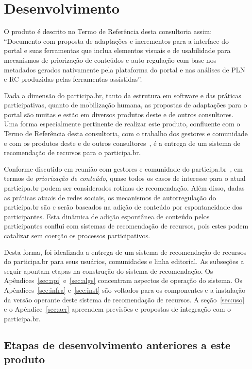 \documentclass[12pt]{article}
\begin{document}
\section{Desenvolvimento}\label{sec:dev}
O produto é descrito no Termo de Referência desta consultoria assim: ``Documento com proposta de adaptações e incrementos para a interface do portal e suas ferramentas que inclua elementos visuais e de usabilidade para mecanismos de priorização de conteúdos e auto-regulação com base nos metadados gerados nativamente pela plataforma do portal e nas análises de PLN e RC produzidas pelas ferramentas assistidas''.

Dada a dimensão do participa.br, tanto da estrutura em software e das práticas participativas, quanto de mobilização humana, as propostas de adaptações para o portal são muitas e estão em diversos produtos deste e de outros consultores. Uma forma especialmente pertinente de realizar este produto, confluente com o Termo de Referência desta consultoria, com o trabalho dos gestores e comunidade e com os produtos deste e de outros consultores~\cite{prodExtra}, é a entrega de um sistema de recomendação de recursos para o participa.br.

Conforme discutido em reunião com gestores e comunidade do participa.br~\cite{padProd4}, em termos de \emph{priorização de conteúdo}, quase todos os casos de interesse para o atual participa.br podem ser considerados rotinas de recomendação. Além disso, dadas as práticas atuais de redes sociais, os mecanismos de autorregulação do participa.br são e serão baseados na adição de conteúdo por espontaneidade dos participantes. Esta dinâmica de adição espontânea de conteúdo pelos participantes conflui com sistemas de recomendação de recursos, pois estes podem catalizar sem coerção os processos participativos.

Desta forma, foi idealizada a entrega de um sistema de recomendação de recursos do participa.br para seus usuários, comunidades e linha editorial. As subseções a seguir apontam etapas na construção do sistema de recomendação. Os Apêndices~\ref{sec:api} e~\ref{sec:algs} concentram aspectos de operação do sistema. Os Apêndices~\ref{sec:infra} e~\ref{sec:inst} são voltados para os componentes e a instalação da versão operante deste sistema de recomendação de recursos. A seção~\ref{sec:uso} e o Apêndice~\ref{sec:acr} apreendem previsões e propostas de integração com o participa.br.

\subsection{Etapas de desenvolvimento anteriores a este produto}
\end{document}
